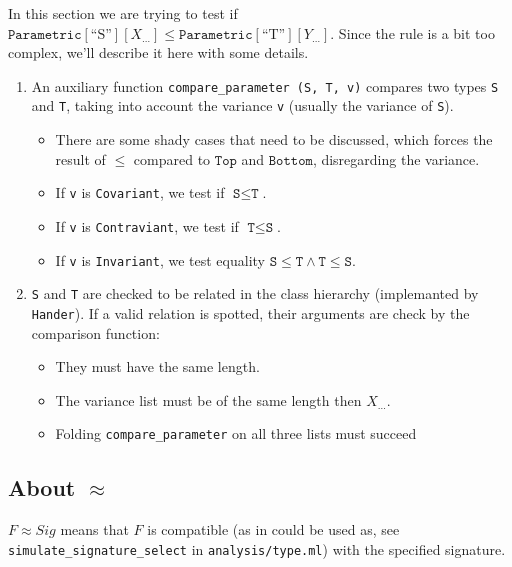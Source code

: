 \documentclass[a4paper]{article}
\newcommand{\pyList}[1]{#1_{\ldots}}
\newcommand{\pyTok}[1]{\texttt{#1}}
\newcommand{\pyTop}{\pyTok{Top}}
\newcommand{\pyBottom}{\pyTok{Bottom}}
\newcommand{\pyParametric}[2]{\pyTok{Parametric}[\text{``#1''}][#2]}
\begin{document}
In this section we are trying to test if
$\pyParametric{S}{\pyList{X}}\le\pyParametric{T}{\pyList{Y}}$.
Since the rule is a bit too complex, we'll describe it here with some details.

\begin{enumerate}
    \item An auxiliary function \pyTok{compare\_parameter (S, T, v)}
        compares two types \pyTok{S} and \pyTok{T}, taking into account the
        variance \pyTok{v} (usually the variance of \pyTok{S}).
        \begin{itemize}
            \item There are some shady cases that need to be discussed, which forces
                the result of $\le$ compared to $\pyTop$ and $\pyBottom$,
                disregarding the variance.
            \item If \pyTok{v} is \pyTok{Covariant}, we test if
                $\pyTok{S}\le\pyTok{T}$.
            \item If \pyTok{v} is \pyTok{Contraviant}, we test if
                $\pyTok{T}\le\pyTok{S}$.
            \item If \pyTok{v} is \pyTok{Invariant}, we test equality
                $\pyTok{S}\le\pyTok{T} \wedge \pyTok{T}\le\pyTok{S}$.
        \end{itemize}


      \item \pyTok{S} and \pyTok{T} are checked to be related in the
        class hierarchy (implemanted by \texttt{Hander}). If a valid relation
        is spotted, their arguments are check by the comparison function:
        \begin{itemize}
            \item They must have the same length.
            \item The variance list must be of the same length then
                $\pyList{X}$.
            \item Folding \pyTok{compare\_parameter} on all three lists must
                succeed
        \end{itemize}
\end{enumerate}


\subsection{About $\approx$}

$F \approx Sig$ means that $F$ is compatible (as in could be used as, see
\texttt{simulate\_signature\_select} in \texttt{analysis/type.ml}) with
the specified signature.
\end{document}
